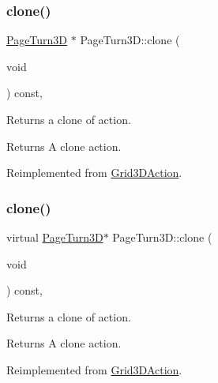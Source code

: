 \subsubsection{\texorpdfstring{clone()}{clone()}\hspace{0.1cm}{\footnotesize\ttfamily [1/2]}}
{\footnotesize\ttfamily \hyperlink{classPageTurn3D}{Page\+Turn3D} $\ast$ Page\+Turn3\+D\+::clone (\begin{DoxyParamCaption}\item[{void}]{ }\end{DoxyParamCaption}) const\hspace{0.3cm}{\ttfamily [override]}, {\ttfamily [virtual]}}

Returns a clone of action.

\begin{DoxyReturn}{Returns}
A clone action. 
\end{DoxyReturn}


Reimplemented from \hyperlink{classGrid3DAction_a01d5b2d60654ef66d6551ac2190ed14c}{Grid3\+D\+Action}.

\mbox{\label{classPageTurn3D_a4679e461471010cd87932c11be5bef9a}} 
\subsubsection{\texorpdfstring{clone()}{clone()}\hspace{0.1cm}{\footnotesize\ttfamily [2/2]}}
{\footnotesize\ttfamily virtual \hyperlink{classPageTurn3D}{Page\+Turn3D}$\ast$ Page\+Turn3\+D\+::clone (\begin{DoxyParamCaption}\item[{void}]{ }\end{DoxyParamCaption}) const\hspace{0.3cm}{\ttfamily [override]}, {\ttfamily [virtual]}}

Returns a clone of action.

\begin{DoxyReturn}{Returns}
A clone action. 
\end{DoxyReturn}


Reimplemented from \hyperlink{classGrid3DAction_a01d5b2d60654ef66d6551ac2190ed14c}{Grid3\+D\+Action}.

\mbox{\label{classPageTurn3D_aa0e4fcc501ac1c486459a41539b3a604}} 
